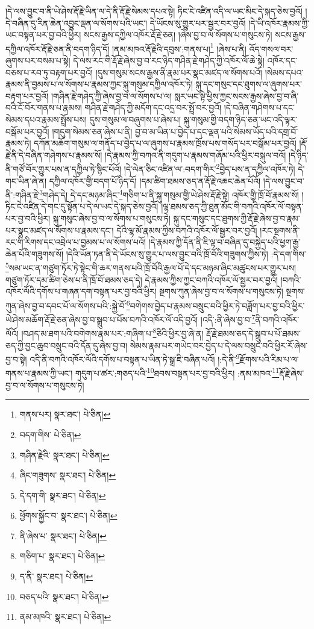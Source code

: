 །དེ་ལས་བྱུང་བ་ནི་ཡེ་ཤེས་རྡོ་རྗེ་ཡིན་ལ་དེ་ནི་རྡོ་རྗེ་སེམས་དཔའ་སྟེ། ཏིང་ངེ་འཛིན་འདི་ལ་ཡང་མིང་དེ་སྐད་ཅེས་བྱའོ། །དེ་བཞིན་དུ་རིན་ཆེན་འབྱུང་ལྡན་ལ་སོགས་པའི་ཡང་། དེ་ཡོངས་སུ་གྱུར་པར་སྦྱར་བར་བྱའོ། །དེ་ཡི་འཁོར་རྣམས་ཀྱི་ཡང་བསྟན་པར་བྱ་བའི་ཕྱིར། སངས་རྒྱས་དཀྱིལ་འཁོར་རྡོ་རྗེ་ཅན། །ཞེས་བྱ་བ་ལ་སོགས་པ་གསུངས་ཏེ། སངས་རྒྱས་དཀྱིལ་འཁོར་རྡོ་རྗེ་ཅན་ནི་བདག་ཉིད་དོ། །ནམ་མཁའ་རྡོ་རྗེའི་དབུས་:གནས་པ།\footnote{གནས་པར།  སྣར་ཐང་།  པེ་ཅིན། } །ཞེས་པ་ནི། འོད་གསལ་བར་ཞུགས་པར་བསམ་པ་སྟེ། དེ་ལས་རང་གི་རྡོ་རྗེ་ཞེས་བྱ་བ་རང་ཉིད་གཤིན་རྗེ་གཤེད་ཀྱི་འཁོར་ལོ་ཆེ་སྟེ། འཁོར་དང་བཅས་པ་རབ་ཏུ་བརྟག་པར་བྱའོ། །དུས་གསུམ་སངས་རྒྱས་ནི་རྣམ་པར་སྣང་མཛད་ལ་སོགས་པའོ། །སེམས་དཔའ་རྣམས་ནི་བྱམས་པ་ལ་སོགས་པ་རྣམས་ཀྱང་སྐུ་གསུམ་དཀྱིལ་འཁོར་ཏེ། སྐུ་དང་གསུང་དང་ཐུགས་ལ་ཞུགས་པར་བརྟག་པར་བྱའོ། །གཤིན་རྗེ་གཤེད་ཀྱི་ཞེས་བྱ་བ་ལ་སོགས་པ་ལ། སླར་ཡང་སྟེ་ཕྱིས་ཀྱང་སངས་རྒྱས་ཞེས་བྱ་བ་ཞི་བའི་ངོ་བོར་གནས་པ་རྣམས། གཤིན་རྗེ་གཤེད་ཀྱི་མདོག་དང་འདྲ་བར་སྤྲོ་བར་བྱའོ། །དེ་བཞིན་གཤེགས་པ་དང་སེམས་དཔའ་རྣམས་སྤྲོས་པས། དུས་གསུམ་ལ་བཞུགས་པ་ཞེས་པ། སྐུ་གསུམ་གྱི་བདག་ཉིད་ཅན་ཡང་འདི་ལྟར་བསྒོམ་པར་བྱའོ། །གདུག་སེམས་ཅན་ཞེས་པ་ནི། བྱ་བ་མ་ཡིན་པ་བྱེད་པ་དང་ལྡན་པའི་སེམས་ཡོད་པའི་དགྲ་བོ་རྣམས་ཏེ། དཀོན་མཆོག་གསུམ་ལ་གནོད་པ་བྱེད་པ་ལ་ཞུགས་པ་རྣམས་ཁྲོས་པས་གསོད་པར་བསྒོམ་པར་བྱའོ། །རྡོ་རྗེ་ནི་དེ་བཞིན་གཤེགས་པ་རྣམས་སོ། །དེ་རྣམས་ཀྱི་བཀའ་ནི་གདུག་པ་རྣམས་གཞོམ་པའི་ཕྱིར་བསྐུལ་བའོ། །དེ་ཉིད་ནི་གཙོ་བོར་གྱུར་པས་ན་དཀྱིལ་ཏེ་སྙིང་པོའོ། །དེ་ལེན་ཅིང་འཛིན་ལ་:བདག་གིར་\footnote{བདག་གིས་  པེ་ཅིན། }བྱེད་པས་ན་དཀྱིལ་འཁོར་ཏེ། དེ་གང་ཡིན་ཞེ་ན། དཀྱིལ་འཁོར་གྱི་བདག་པོ་ཉིད་དོ། །དམ་ཚིག་ཐམས་ཅད་ན་རྡོ་རྗེ་འཆང་ཆེན་པོའོ། །དེ་ལས་བྱུང་བ་ནི་:གཤིན་རྗེ་\footnote{གཤིན་རྗེའི་  སྣར་ཐང་།  པེ་ཅིན། }གཤེད་དེ། དེ་དང་མཉམ་ཞིང་\footnote{ཞིང་གཟུགས་  སྣར་ཐང་།  པེ་ཅིན། }གཅིག་པ་ནི་སྐུ་གསུམ་གྱི་ཡེ་ཤེས་རྡོ་རྗེ་སྟེ། འཁོར་གྱི་ཁྲོ་བོ་རྣམས་སོ། །ཏིང་ངེ་འཛིན་དེ་གང་དུ་སྟོན་པ་དེ་ལ་ཡང་དེ་སྐད་ཅེས་བྱའོ། །ལྷ་ཐམས་ཅད་ཀྱི་ཐུན་མོང་གི་བཀའི་འཁོར་ལོ་བསྟན་པར་བྱ་བའི་ཕྱིར། སྐུ་གསུང་ཞེས་བྱ་བ་ལ་སོགས་པ་གསུངས་ཏེ། སྐུ་དང་གསུང་དང་ཐུགས་ཀྱི་རྡོ་རྗེ་ཞེས་བྱ་བ་རྣམ་པར་སྣང་མཛད་ལ་སོགས་པ་རྣམས་དང་། དེའི་ལྷ་མོ་རྣམས་ཀྱིས་བཀའི་འཁོར་ལོ་སྦྱར་བར་བྱའོ། །རང་སྔགས་ནི་རང་གི་རིགས་དང་འབྲེལ་པ་བྱམས་པ་ལ་སོགས་པའོ། །དེ་རྣམས་ཀྱི་དོན་ནི་ཇི་ལྟ་བ་བཞིན་དུ་བསྐྱེད་པའི་ཕྱག་རྒྱ་ཆེན་པོའི་གཟུགས་སོ། །དེའི་ཡོན་ཏན་ནི་དེ་ཡོངས་སུ་གྱུར་པ་ལས་བྱུང་བའི་ཁྲོ་བོའི་གཟུགས་ཀྱིས་ཏེ། :དེ་དག་གིས་\footnote{དེ་དག་གི་  སྣར་ཐང་།  པེ་ཅིན། }སམ་ཡང་ན་གཙུག་ཏོར་ཏེ་སྟེང་གི་ཆར་གནས་པའི་ཁྲོ་བོའི་རྒྱལ་པོ་དེ་དང་མཉམ་ཞིང་མཚུངས་པར་གྱུར་པས། གཙུག་ཏོར་དམ་ཚིག་ཅེས་པ་ནི་ཁྲོ་བོ་ཐམས་ཅད་དེ། དེ་རྣམས་ཀྱིས་ཀྱང་བཀའི་འཁོར་ལོ་སྦྱར་བར་བྱའོ། །བཀའི་འཁོར་ལོའི་དགོས་པ་གཞན་དག་བསྟན་པར་བྱ་བའི་ཕྱིར། སྔགས་ཀུན་ཞེས་བྱ་བ་ལ་སོགས་པ་གསུངས་ཏེ། སྔགས་ཀུན་ཞེས་བྱ་བ་དབང་པོ་ལ་སོགས་པའི་:སྐྱེ་བོ་\footnote{ཕྱོགས་སྐྱོང་བ་  སྣར་ཐང་།  པེ་ཅིན། }བགེགས་བྱེད་པ་རྣམས་བསྲུང་བའི་ཕྱིར་ཏེ་བཟློག་པར་བྱ་བའི་ཕྱིར་ཡེ་ཤེས་མཆོག་རྡོ་རྗེ་ཅན་ཞེས་བྱ་བ་སྒྲུབ་པ་པོས་བཀའི་འཁོར་ལོ་འདི་བྱའོ། །འདི་:ནི་ཞེས་བྱ་བ་\footnote{ནི་ཞེས་པ་  སྣར་ཐང་།  པེ་ཅིན། }ནི་བཀའི་འཁོར་ལོའོ། །བཤད་མ་ཐག་པའི་བགེགས་རྣམ་པར་:གཞིག་པ་\footnote{གཅིག་པ་  སྣར་ཐང་།  པེ་ཅིན། }ཅིའི་ཕྱིར་བྱ་ཞེ་ན། རྡོ་རྗེ་ཐམས་ཅད་དེ་སྒྲུབ་པ་པོ་ཐམས་ཅད་ཀྱི་བྱང་ཆུབ་བསྲུང་བའི་དོན་དུ་ཞེས་བྱ་བ། སེམས་རྣམ་པར་གཡེང་བར་བྱེད་པ་དེ་ལས་བསྲུང་བའི་ཕྱིར་རོ་ཞེས་བྱ་བ་སྟེ། འདི་ནི་བཀའི་འཁོར་ལོའི་དགོས་པ་བསྟན་པ་ཡིན་ཏེ་སྒྲ་ཇི་བཞིན་པའོ། །:དེ་ནི་\footnote{ད་ནི་  སྣར་ཐང་།  པེ་ཅིན། }རྫོགས་པའི་རིམ་པ་ལ་གནས་པ་རྣམས་ཀྱི་ཡང་། གདུག་པ་ཚར་:གཅད་པའི་\footnote{བཅད་པའི་  སྣར་ཐང་།  པེ་ཅིན། }ཐབས་བསྟན་པར་བྱ་བའི་ཕྱིར། :ནམ་མཁའ་\footnote{ནམ་མཁའི་  སྣར་ཐང་།  པེ་ཅིན། }རྡོ་རྗེ་ཞེས་བྱ་བ་ལ་སོགས་པ་གསུངས་ཏེ། 